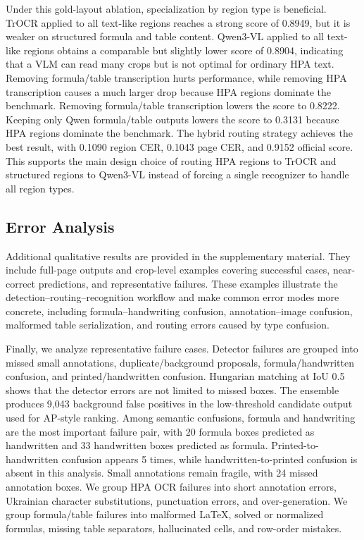 \documentclass[runningheads]{llncs}
\begin{document}
Under this gold-layout ablation, specialization by region type is beneficial. TrOCR applied to all text-like regions reaches a strong score of 0.8949, but it is weaker on structured formula and table content. Qwen3-VL applied to all text-like regions obtains a comparable but slightly lower score of 0.8904, indicating that a VLM can read many crops but is not optimal for ordinary HPA text. Removing formula/table transcription hurts performance, while removing HPA transcription causes a much larger drop because HPA regions dominate the benchmark. Removing formula/table transcription lowers the score to 0.8222. Keeping only Qwen formula/table outputs lowers the score to 0.3131 because HPA regions dominate the benchmark. The hybrid routing strategy achieves the best result, with 0.1090 region CER, 0.1043 page CER, and 0.9152 official score. This supports the main design choice of routing HPA regions to TrOCR and structured regions to Qwen3-VL instead of forcing a single recognizer to handle all region types.

\subsection{Error Analysis}
\label{sec:error-analysis}

Additional qualitative results are provided in the supplementary material.  They include full-page outputs and crop-level examples covering successful cases, near-correct predictions, and representative failures. These examples illustrate the detection--routing--recognition workflow and make common error modes more concrete, including formula--handwriting confusion, annotation--image confusion, malformed table serialization, and routing errors caused by type confusion.

Finally, we analyze representative failure cases. Detector failures are grouped into missed small annotations, duplicate/background proposals, formula/handwritten confusion, and printed/handwritten confusion. Hungarian matching at IoU 0.5 shows that the detector errors are not limited to missed boxes. The ensemble produces 9,043 background false positives in the low-threshold candidate output used for AP-style ranking. Among semantic confusions, formula and handwriting are the most important failure pair, with 20 formula boxes predicted as handwritten and 33 handwritten boxes predicted as formula. Printed-to-handwritten confusion appears 5 times, while handwritten-to-printed confusion is absent in this analysis. Small annotations remain fragile, with 24 missed annotation boxes. We group HPA OCR failures into short annotation errors, Ukrainian character substitutions, punctuation errors, and over-generation. We group formula/table failures into malformed LaTeX, solved or normalized formulas, missing table separators, hallucinated cells, and row-order mistakes.
\end{document}
